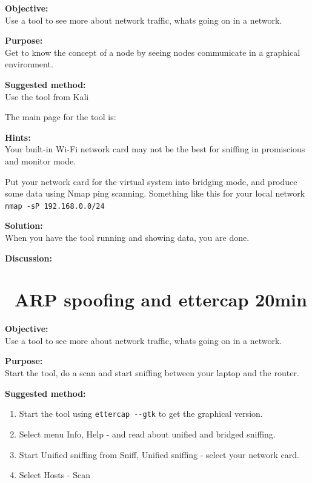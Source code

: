 \documentclass[a4paper,11pt,notitlepage]{report}
\begin{document}
{\bf Objective:}\\
Use a tool to see more about network traffic, whats going on in a network.

{\bf Purpose:}\\
Get to know the concept of a node by seeing nodes communicate in a graphical environment.

{\bf Suggested method:}\\
Use the tool from Kali

The main page for the tool is:

{\bf Hints:}\\
Your built-in Wi-Fi network card may not be the best for sniffing in promiscious and monitor mode.

Put your network card for the virtual system into bridging mode, and produce some data using Nmap ping scanning. Something like this for your local network \verb+nmap -sP 192.168.0.0/24+

{\bf Solution:}\\
When you have the tool running and showing data, you are done.

{\bf Discussion:}\\


\chapter{\faInfoCircle\ ARP spoofing and ettercap 20min}
\label{ex:arp-spoof-ettercap}



{\bf Objective:}\\
Use a tool to see more about network traffic, whats going on in a network.

{\bf Purpose:}\\
Start the tool, do a scan and start sniffing between your laptop and the router.

{\bf Suggested method:}
\begin{enumerate}
\item Start the tool using \verb+ettercap --gtk+ to get the graphical version.
\item Select menu Info, Help - and read about unified and bridged sniffing.
\item Start Unified sniffing from Sniff, Unified sniffing - select your network card.
\item Select Hosts - Scan
\end{enumerate}
\end{document}
